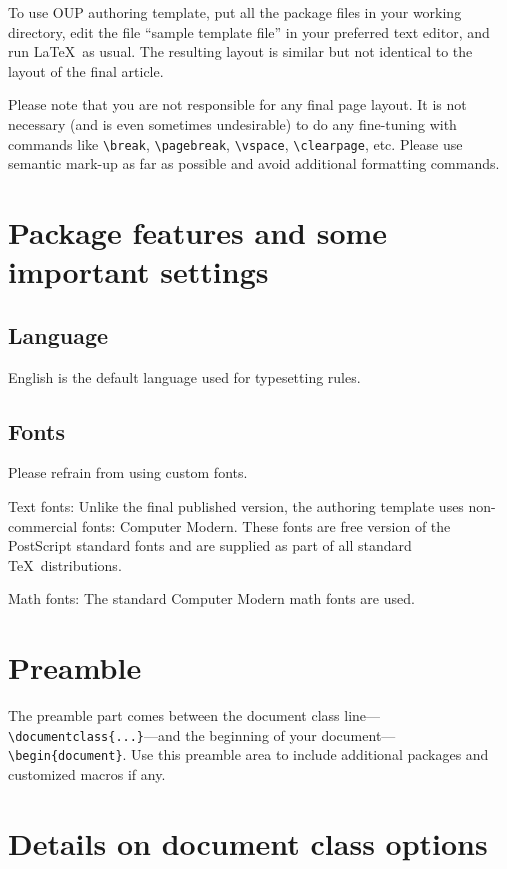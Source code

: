 \documentclass{article}
\begin{document}
To use OUP authoring template, put all the package files in your working directory, edit the file ``sample template file'' in your preferred text editor, and run \LaTeX\ as usual. The resulting layout is similar but not identical to the layout of the final article.

Please note that you are not responsible for any final page layout. It is not necessary (and is even sometimes undesirable) to do any fine-tuning with commands like \verb+\break+, \verb+\pagebreak+, \verb+\vspace+, \verb+\clearpage+, etc. Please use semantic mark-up as far as possible and avoid additional formatting commands.


\section{Package features and some important settings}

\subsection{Language}
English is the default language used for typesetting rules.

\subsection{Fonts}
Please refrain from using custom fonts.

\medskip

\noindent Text fonts: Unlike the final published version, the authoring template uses non-commercial fonts: Computer Modern. These fonts are free version of the PostScript standard fonts and are supplied as part of all standard \TeX\ distributions.

\medskip

\noindent Math fonts: The standard Computer Modern math fonts are used.

\section{Preamble}
The preamble part comes between the document class line---\newline\verb+\documentclass{...}+---and the beginning of your document---\verb+\begin{document}+. Use this preamble area to include additional packages and customized macros if any.

\section{Details on document class options}
\end{document}
